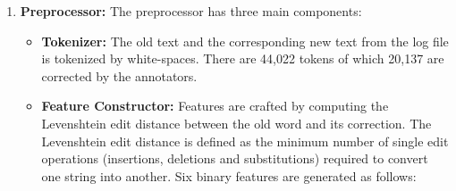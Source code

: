 \documentclass[letterpaper]{article}
\begin{document}
\begin{enumerate}
\item \textbf{Preprocessor: } The preprocessor has three main components:
\begin{itemize}
\item \textbf{Tokenizer: } The old text and the corresponding new text from the log file is tokenized by white-spaces. There are 44,022 tokens of which 20,137 are corrected by the annotators.

\item \textbf{Feature Constructor: } Features are crafted by computing the Levenshtein edit distance between the old word and its correction. The Levenshtein edit distance \cite{Wagner_74} is defined as the minimum number of single edit operations (insertions, deletions and substitutions) required to convert one string into another. Six binary features are generated as follows: 
%
%

\end{itemize}
\end{enumerate}
\end{document}
